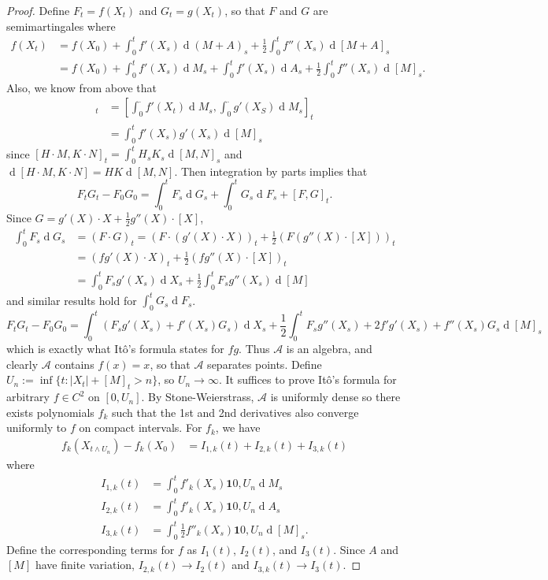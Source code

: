 \documentclass[11pt, a4paper]{memoir}
\theoremstyle{change}
\theoremstyle{plain}
\theoremstyle{nonumberplain}
\newtheorem{proof}{Proof}
\renewcommand{\d}[1]{\ensuremath{\operatorname{d}\!{#1}}}
\newcommand{\idc}{\mathbf{1}}
\numberwithin{equation}{section}
\begin{document}
\begin{proof}
    Define $F_t=f(X_t)$ and $G_t=g(X_t)$, so that $F$ and $G$ are semimartingales where
    \begin{align*}
        f(X_t) &= f(X_0) + \int_0^tf'(X_s)\d{(M+A)_s}+\frac{1}{2}\int_0^tf''(X_s)\d{[M+A]_s}\\
               &= f(X_0)+\int_0^tf'(X_s)\d{M_s}+\int_0^tf'(X_s)\d{A_s}+\frac{1}{2}\int_0^tf''(X_s)\d{[M]_s}.
    \end{align*}
    Also, we know from above that
    \begin{align*}
        [F,G]_t &= [\int_0^\cdot f'(X_t)\d{M_s},\int_0^\cdot g'(X_S)\d{M_s}]_t\\
                &= \int_0^t f'(X_s)g'(X_s)\d{[M]_s}
    \end{align*}
    since $[H\cdot M,K\cdot N]_t=\int_0^tH_sK_s\d{[M,N]}_s$ and $\d{[H\cdot M,K\cdot N]}=HK\d{[M,N]}$.
    Then integration by parts implies that
    \begin{equation*}
        F_tG_t-F_0G_0 = \int_0^t F_s\d{G_s}+\int_0^t G_s\d{F_s}+[F,G]_t.
    \end{equation*}
    Since $G=g'(X)\cdot X+\frac{1}{2}g''(X)\cdot[X]$,
    \begin{align*}
        \int_0^t F_s\d{G_s} &= (F\cdot G)_t=(F\cdot(g'(X)\cdot X))_t+\frac{1}{2}(F(g''(X)\cdot[X]))_t\\
                            &= (fg'(X)\cdot X)_t+\frac{1}{2}(fg''(X)\cdot[X])_t\\
                            &= \int_0^t F_sg'(X_s)\d{X_s}+\frac{1}{2}\int_0^tF_sg''(X_s)\d{[M]}
    \end{align*}
    and similar results hold for $\int_0^t G_s\d{F_s}$.
    \begin{equation*}
        F_tG_t-F_0G_0 = \int_0^t(F_sg'(X_s)+f'(X_s)G_s)\d{X_s}+\frac{1}{2}\int_0^tF_sg''(X_s)+2f'g'(X_s)+f''(X_s)G_s\d{[M]_s}
    \end{equation*}
    which is exactly what Itô's formula states for $fg$.
    Thus $\mathcal{A}$ is an algebra, and clearly $\mathcal{A}$ contains $f(x)=x$, so that $\mathcal{A}$ separates points.
    Define $U_n:=\inf\{t:|X_t|+[M]_t>n\}$, so $U_n\to\infty$.
    It suffices to prove Itô's formula for arbitrary $f\in C^2$ on $[0,U_n]$.
    By Stone-Weierstrass, $\mathcal{A}$ is uniformly dense so there exists polynomials $f_k$ such that the 1st and 2nd derivatives also converge uniformly to $f$ on compact intervals.
    For $f_k$, we have
    \begin{align*}
        f_k(X_{t\wedge U_n}) - f_k(X_0) &= I_{1,k}(t)+I_{2,k}(t)+I_{3,k}(t)
    \end{align*}
    where
    \begin{align*}
        I_{1,k}(t) &= \int_0^tf'_k(X_s)\idc{0,U_n}\d{M_s}\\
        I_{2,k}(t) &= \int_0^tf'_k(X_s)\idc{0,U_n}\d{A_s}\\
        I_{3,k}(t) &= \int_0^t\frac{1}{2}f''_k(X_s)\idc{0,U_n}\d{[M]_s}.
    \end{align*}
    Define the corresponding terms for $f$ as $I_1(t)$, $I_2(t)$, and $I_3(t)$.
    Since $A$ and $[M]$ have finite variation, $I_{2,k}(t)\to I_2(t)$ and $I_{3,k}(t)\to I_3(t)$.


\end{proof}
\end{document}
